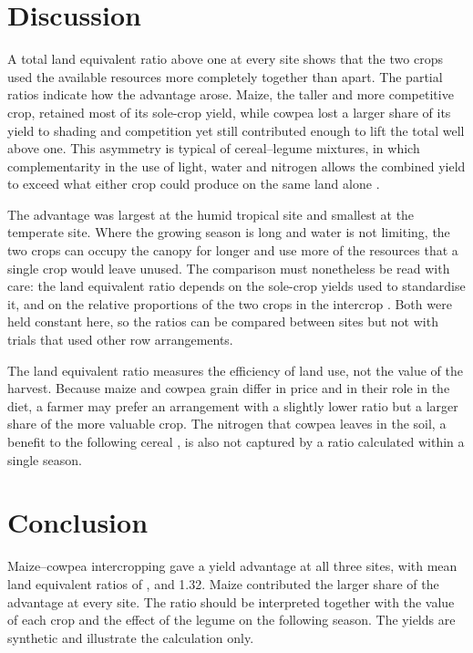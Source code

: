 \section{Discussion}

A total land equivalent ratio above one at every site shows that the two
crops used the available resources more completely together than apart. The
partial ratios indicate how the advantage arose. Maize, the taller and more
competitive crop, retained most of its sole-crop yield, while cowpea lost a
larger share of its yield to shading and competition yet still contributed
enough to lift the total well above one. This asymmetry is typical of
cereal--legume mixtures, in which complementarity in the use of light,
water and nitrogen allows the combined yield to exceed what either crop could
produce on the same land alone \parencite{brooker2015}.

The advantage was largest at the humid tropical site and smallest at the
temperate site. Where the growing season is long and water is not limiting,
the two crops can occupy the canopy for longer and use more of the resources
that a single crop would leave unused. The comparison must nonetheless be read
with care: the land equivalent ratio depends on the sole-crop yields used to
standardise it, and on the relative proportions of the two crops in the
intercrop \parencite{mead1980}. Both were held constant here, so the ratios
can be compared between sites but not with trials that used other row
arrangements.

The land equivalent ratio measures the efficiency of land use, not the value
of the harvest. Because maize and cowpea grain differ in price and in their
role in the diet, a farmer may prefer an arrangement with a slightly lower
ratio but a larger share of the more valuable crop. The nitrogen that cowpea
leaves in the soil, a benefit to the following cereal \parencite{vanlauwe2010},
is also not captured by a ratio calculated within a single season.

\section{Conclusion}

Maize--cowpea intercropping gave a yield advantage at all three sites, with
mean land equivalent ratios of ,  and
1.32. Maize contributed the larger share of the advantage at every
site. The ratio should be interpreted together with the value of each crop and
the effect of the legume on the following season. The yields are synthetic
and illustrate the calculation only.
